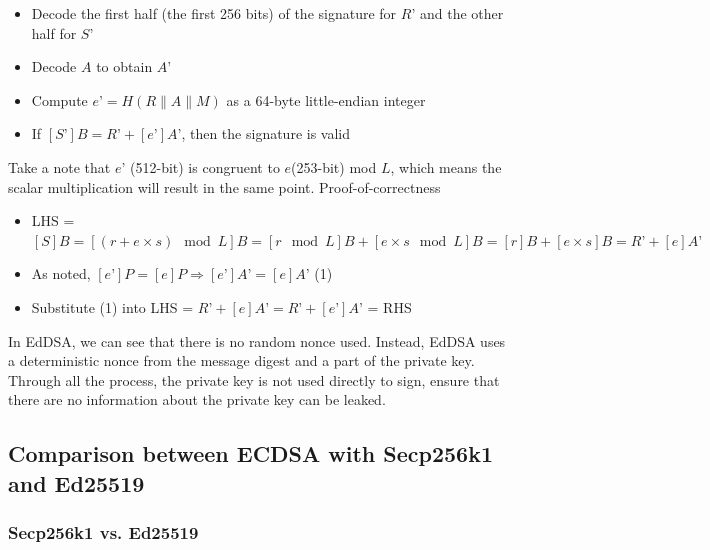 \begin{itemize}
  \item Decode the first half (the first 256 bits) of the signature for $R’$ and the other half for $S’$
  \item Decode $A$ to obtain $A’$
  \item Compute $e’ = H(R\|A\|M)$ as a 64-byte little-endian integer
  \item If $[S’]B = R’ + [e’]A’$, then the signature is valid
\end{itemize}

Take a note that $e’$ (512-bit) is congruent to $e$(253-bit) mod $L$, which means the scalar multiplication will result in the same point. Proof-of-correctness

\begin{itemize}
  \item LHS = $[S]B = [(r + e \times s) \mod L]B = [r \mod L]B + [e \times s \mod L]B = [r]B + [e \times s]B = R’ + [e]A’$
  \item As noted, $[e’]P = [e]P \Rightarrow [e’]A’ = [e]A’$ (1)
  \item Substitute (1) into LHS = $R’ + [e]A’ = R’ + [e’]A’$ = RHS
\end{itemize}

In EdDSA, we can see that there is no random nonce used. Instead, EdDSA uses a deterministic nonce from the message digest and a part of the private key. Through all the process, the private key is not used directly to sign, ensure that there are no information about the private key can be leaked.

\subsection{Comparison between ECDSA with Secp256k1 and Ed25519}

\subsubsection{Secp256k1 vs. Ed25519}

